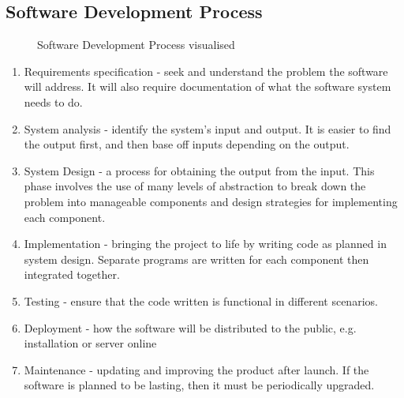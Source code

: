 \documentclass[11pt,a4 paper]{book}
\theoremstyle{plain}
\theoremstyle{definition}
\theoremstyle{remark}
\begin{document}
\begin{flushleft}
\section{Software Development Process}
\begin{figure}[H]
\centering
{}
\label{fig:example1}
\caption{Software Development Process visualised}
\end{figure} 
\begin{enumerate}
\item Requirements specification - seek and understand the problem the software will address. It will also require documentation of what the software system needs to do.
\item System analysis - identify the system's input and output. It is easier to find the output first, and then base off inputs depending on the output.
\item System Design - a process for obtaining the output from the input. This phase 
involves the use of many levels of abstraction to break down the problem into manageable 
components and design strategies for implementing each component. 
\item Implementation - bringing the project to life by writing code as planned in system design. Separate programs are written for each component then integrated together.
\item Testing - ensure that the code written is functional in different scenarios. 
\item Deployment - how the software will be distributed to the public, e.g. installation or server online
\item Maintenance - updating and improving the product after launch. If the software is planned to be lasting, then it must be periodically upgraded.
\end{enumerate}

\end{flushleft}
\end{document}
